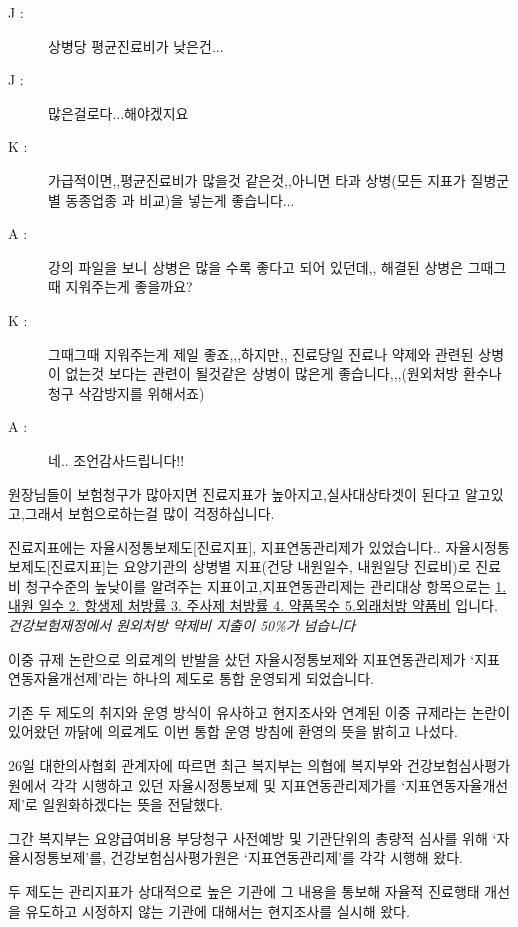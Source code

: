 \begin{tcolorbox}[enhanced jigsaw,breakable,pad at break*=1mm,
  colback=blue!5!white,colframe=blue!75!black,title= 실사 나오지 않을까요?,
  watermark color=white,watermark text=실사]
\begin{description}
\item[J :] 상병당 평균진료비가 낮은건...
\item[J :] 많은걸로다...해야겠지요
\item[K :] 가급적이면,,평균진료비가 많을것 같은것,,아니면 타과 상병(모든 지표가 질병군별 동종업종 과 비교)을 넣는게 좋습니다...
\item[A :] 강의 파일을 보니 상병은 많을 수록 좋다고 되어 있던데,, 해결된 상병은 그때그때 지워주는게 좋을까요? 
\item[K :] 그때그때 지워주는게 제일 좋죠,,,하지만,, 진료당일 진료나 약제와 관련된 상병이 없는것 보다는 관련이 될것같은  상병이 많은게 좋습니다,,,(원외처방 환수나 청구 삭감방지를 위해서죠)
\item[A :] 네.. 조언감사드립니다!! 
\end{description}
\end{tcolorbox}
원장님들이 보험청구가 많아지면 진료지표가 높아지고,실사대상타겟이 된다고 알고있고,그래서 보험으로하는걸 많이 걱정하십니다.\par
진료지표에는 자율시정통보제도[진료지표], 지표연동관리제가 있었습니다.. 자율시정통보제도[진료지표]는 요양기관의 상병별 지표(건당 내원일수, 내원일당 진료비)로 진료비 청구수준의 높낮이를 알려주는 지표이고,지표연동관리제는 관리대상 항목으로는 \uline{1.내원 일수 2. 항생제  처방률 3. 주사제  처방률 4. 약품목수 5.외래처방 약품비} 입니다. \emph{건강보험재정에서 원외처방 약제비 지출이 50\%가 넘습니다} \par
이중 규제 논란으로 의료계의 반발을 샀던 자율시정통보제와 지표연동관리제가 `지표연동자율개선제'라는 하나의 제도로 통합 운영되게 되었습니다.\par

기존 두 제도의 취지와 운영 방식이 유사하고 현지조사와 연계된 이중 규제라는 논란이 있어왔던 까닭에 의료계도 이번 통합 운영 방침에 환영의 뜻을 밝히고 나섰다.

26일 대한의사협회 관계자에 따르면 최근 복지부는 의협에 복지부와 건강보험심사평가원에서 각각 시행하고 있던 자율시정통보제 및 지표연동관리제가를 `지표연동자율개선제'로 일원화하겠다는 뜻을 전달했다.

그간 복지부는 요양급여비용 부당청구 사전예방 및 기관단위의 총량적 심사를 위해 `자율시정통보제'를, 건강보험심사평가원은 `지표연동관리제'를 각각 시행해 왔다.

두 제도는 관리지표가 상대적으로 높은 기관에 그 내용을 통보해 자율적 진료행태 개선을 유도하고 시정하지 않는 기관에 대해서는 현지조사를 실시해 왔다.

